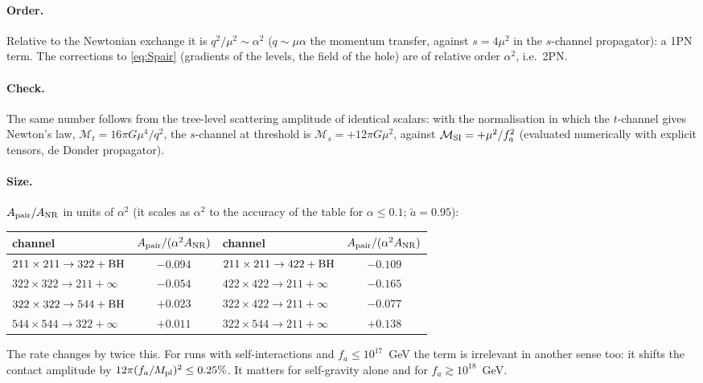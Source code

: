 \documentclass[11pt]{article}
\newcommand{\Mpl}{M_{\rm pl}}
\begin{document}
\paragraph{Order.} Relative to the Newtonian exchange it is $q^2/\mu^2\sim\alpha^2$ ($q\sim\mu\alpha$ the momentum transfer, against
$s=4\mu^2$ in the $s$-channel propagator): a 1PN term. The corrections to \eqref{eq:Spair} (gradients of the levels, the field of the
hole) are of relative order $\alpha^2$, i.e.\ 2PN.
\paragraph{Check.} The same number follows from the tree-level scattering amplitude of identical scalars: with the normalisation in
which the $t$-channel gives Newton's law, $\mathcal M_t=16\pi G\mu^4/q^2$, the $s$-channel at threshold is $\mathcal M_s=+12\pi G\mu^2$,
against $\mathcal M_{\rm SI}=+\mu^2/f_a^2$ (evaluated numerically with explicit tensors, de Donder propagator).
\paragraph{Size.} $A_{\rm pair}/A_{\rm NR}$ in units of $\alpha^2$ (it scales as $\alpha^2$ to the accuracy of the table for $\alpha\le0.1$; $\tilde a=0.95$):
\begin{center}
\begin{tabular}{@{}lc@{\qquad}lc@{}}
\toprule
channel & $A_{\rm pair}/(\alpha^2A_{\rm NR})$ & channel & $A_{\rm pair}/(\alpha^2A_{\rm NR})$ \\
\midrule
$211\times211\to322+{\rm BH}$ & $-0.094$ & $211\times211\to422+{\rm BH}$ & $-0.109$ \\
$322\times322\to211+\infty$ & $-0.054$ & $422\times422\to211+\infty$ & $-0.165$ \\
$322\times322\to544+{\rm BH}$ & $+0.023$ & $322\times422\to211+\infty$ & $-0.077$ \\
$544\times544\to322+\infty$ & $+0.011$ & $322\times544\to211+\infty$ & $+0.138$ \\
\bottomrule
\end{tabular}
\end{center}
The rate changes by twice this. For runs with self-interactions and $f_a\le10^{17}$~GeV the term is irrelevant in another sense too:
it shifts the contact amplitude by $12\pi(f_a/\Mpl)^2\le0.25\%$. It matters for self-gravity alone and for $f_a\gtrsim10^{18}$~GeV.
\end{document}
